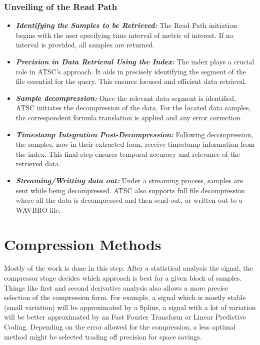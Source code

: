 \documentclass[conference]{IEEEtran}
\begin{document}
\subsubsection{Unveiling of the Read Path}\label{SCMC}
\begin{itemize}

\item{\textbf{\textit{Identifying the Samples to be Retrieved:}}} The Read Path initiation begins with the user specifying time interval of metric of interest. If no interval is provided, all samples are returned.

\vspace{5pt}
\item{\textbf{\textit{Precision in Data Retrieval Using the Index:}}} The index plays a crucial role in ATSC's approach. It aids in precisely identifying the segment of the file essential for the query. This ensures focused and efficient data retrieval.

\vspace{5pt}
\item{\textbf{\textit{Sample decompression:}}} Once the relevant data segment is identified, ATSC initiates the decompression of the data.
For the located data samples, the correspondent formula translation is applied and any error correction.

\vspace{5pt}
\item{\textbf{\textit{Timestamp Integration Post-Decompression:}}} Following decompression, the samples, now in their extracted form, receive timestamp information from the index. This final step ensures temporal accuracy and relevance of the retrieved data.

\vspace{5pt}
\item{\textbf{\textit{Streaming/Writting data out:}}} Under a streaming process, samples are sent while being decompressed. ATSC also supports full file decompression where all the data is decompressed and then send out, or written out to a WAVBRO file.
\end{itemize}

\section{Compression Methods}

Mostly of the work is done in this step. 
After a statistical analysis the signal, the compressor stage decides which approach is best for a given block of samples.
Things like first and second derivative analysis also allows a more precise selection of the compression form. 
For example, a signal which is mostly stable (small variation) will be approximated by a Spline, a signal with a lot of variation will be better approximated by an Fast Fourier Transform or Linear Predictive Coding.
Depending on the error allowed for the compression, a less optimal method might be selected trading off precision for space savings. 
\end{document}
